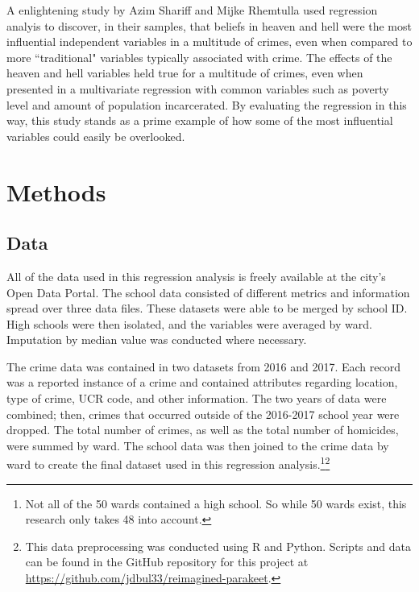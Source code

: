 \documentclass[12pt]{article}
\begin{document}
\par

A enlightening study by Azim Shariff and Mijke Rhemtulla used regression analyis to discover, in their samples, that beliefs in heaven and hell were the most influential independent variables in a multitude of crimes, even when compared to more ``traditional" variables typically associated with crime.\cite{shariff}  The effects of the heaven and hell variables held true for a multitude of crimes, even when presented in a multivariate regression with common variables such as poverty level and amount of population incarcerated.  By evaluating the regression in this way, this study stands as a prime example of how some of the most influential variables could easily be overlooked.


	\section{Methods}


\subsection{Data}

All of the data used in this regression analysis is freely available at the city's Open Data Portal.\cite{c1data}\cite{c2data}\cite{s1data}\cite{s2data}\cite{s3data}  The school data consisted of different metrics and information spread over three data files.  These datasets were able to be merged by school ID.  High schools were then isolated, and the variables were averaged by ward.  Imputation by median value was conducted where necessary.

\par

The crime data was contained in two datasets from 2016 and 2017.  Each record was a reported instance of a crime and contained attributes regarding location, type of crime, UCR code, and other information.  The two years of data were combined; then, crimes that occurred outside of the 2016-2017 school year were dropped.  The total number of crimes, as well as the total number of homicides, were summed by ward.  The school data was then joined to the crime data by ward to create the final dataset used in this regression analysis.\footnote{Not all of the 50 wards contained a high school.  So while 50 wards exist, this research only takes 48 into account.}\footnote{This data preprocessing was conducted using R and Python.  Scripts and data can be found in the GitHub repository for this project at \href{https://github.com/jdbul33/reimagined-parakeet}{https://github.com/jdbul33/reimagined-parakeet}.}
\end{document}
